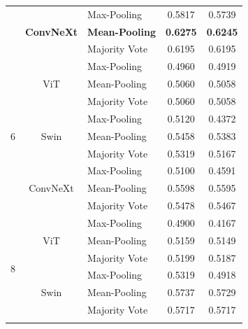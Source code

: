 \begin{table}[H]
\begin{tabular}{cclcc}
            & \multirow{3}{*}{\textbf{ConvNeXt}} 
                & Max-Pooling   & 0.5817 & 0.5739 \\
            &   & \textbf{Mean-Pooling}  & \textbf{0.6275} & \textbf{0.6245} \\
            &   & Majority Vote & 0.6195 & 0.6195 \\
            
        \midrule

        \multirow{9}{*}{6} 
            & \multirow{3}{*}{ViT} 
                & Max-Pooling   & 0.4960 & 0.4919 \\
            &   & Mean-Pooling  & 0.5060 & 0.5058 \\
            &   & Majority Vote & 0.5060 & 0.5058 \\
            \cmidrule{2-5} %
            
            & \multirow{3}{*}{Swin} 
                & Max-Pooling   & 0.5120 & 0.4372 \\
            &   & Mean-Pooling  & 0.5458 & 0.5383 \\
            &   & Majority Vote & 0.5319 & 0.5167 \\
            \cmidrule{2-5}
            
            & \multirow{3}{*}{ConvNeXt} 
                & Max-Pooling   & 0.5100 & 0.4591 \\
            &   & Mean-Pooling  & 0.5598 & 0.5595 \\
            &   & Majority Vote & 0.5478 & 0.5467 \\
            
        \midrule

        \multirow{9}{*}{8} 
            & \multirow{3}{*}{ViT} 
                & Max-Pooling   & 0.4900 & 0.4167 \\
            &   & Mean-Pooling  & 0.5159 & 0.5149 \\
            &   & Majority Vote & 0.5199 & 0.5187 \\
            \cmidrule{2-5} %
            
            & \multirow{3}{*}{Swin} 
                & Max-Pooling   & 0.5319 & 0.4918 \\
            &   & Mean-Pooling  & 0.5737 & 0.5729 \\
            &   & Majority Vote & 0.5717 & 0.5717 \\
            \cmidrule{2-5}
            

\end{tabular}
\end{table}
